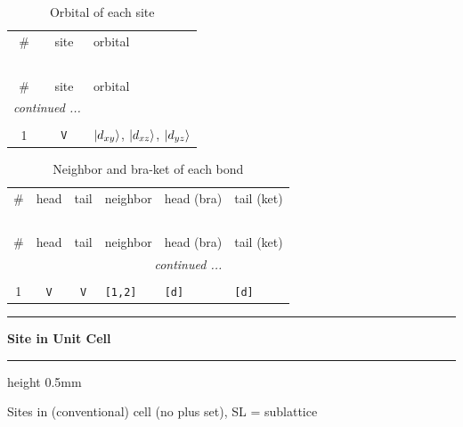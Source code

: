 \documentclass[fleqn,10pt,landscape]{jsarticle}
\begin{document}
\renewcommand{\arraystretch}{1.6}
\begin{longtable}[l]{ccl}
\captionsetup{justification=raggedright, singlelinecheck=off}
\caption{Orbital of each site}
 \\
 \hline \hline
\# & site & orbital \\ \hline \endfirsthead

\multicolumn{2}{l}{\tablename\ \thetable{}} \\
 \hline \hline
\# & site & orbital \\ \hline \endhead

 \hline \hline
\multicolumn{2}{r}{\footnotesize\it continued ...} \\ \endfoot

 \hline \hline
\multicolumn{2}{r}{} \\ \endlastfoot

1 & \texttt{V} & $\ket{d_{xy}}$, $\ket{d_{xz}}$, $\ket{d_{yz}}$ \\
\end{longtable}
\renewcommand{\arraystretch}{1.6}
\begin{longtable}[l]{ccclll}
\captionsetup{justification=raggedright, singlelinecheck=off}
\caption{Neighbor and bra-ket of each bond}
 \\
 \hline \hline
\# & head & tail & neighbor & head (bra) & tail (ket) \\ \hline \endfirsthead

\multicolumn{5}{l}{\tablename\ \thetable{}} \\
 \hline \hline
\# & head & tail & neighbor & head (bra) & tail (ket) \\ \hline \endhead

 \hline \hline
\multicolumn{5}{r}{\footnotesize\it continued ...} \\ \endfoot

 \hline \hline
\multicolumn{5}{r}{} \\ \endlastfoot

1 & \texttt{V} & \texttt{V} & \texttt{[1,2]} & \texttt{[d]} & \texttt{[d]} \\
\end{longtable}
\vspace{5mm}
\noindent \rule[0.5mm]{5mm}{0.5mm}\hspace{3mm}\textbf{Site in Unit Cell}\hspace{3mm}\leaders\hrule height 0.5mm\hfill\kern0pt
\vspace{3mm}

\noindent Sites in (conventional) cell (no plus set), SL = sublattice
\end{document}
